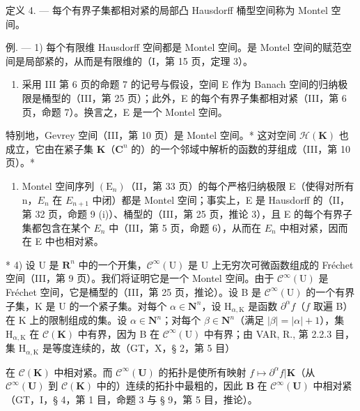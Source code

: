 定义 4. --- 每个有界子集都相对紧的局部凸 Hausdorff 桶型空间称为 Montel 空间。

例. --- 1) 每个有限维 Hausdorff 空间都是 Montel 空间。是 Montel 空间的赋范空间是局部紧的，从而是有限维的（I，第 15 页，定理 3）。

\begin{enumerate}
\def\labelenumi{\arabic{enumi})}
\setcounter{enumi}{1}
\tightlist
\item
  采用 III 第 6 页的命题 7 的记号与假设，空间 E 作为 Banach 空间的归纳极限是桶型的（III，第 25 页）；此外，E 的每个有界子集都相对紧（III，第 6 页，命题 7）。换言之，E 是一个 Montel 空间。
\end{enumerate}

特别地，Gevrey 空间（III，第 10 页）是 Montel 空间。* 这对空间 \(\mathcal{H}(\mathbf{K})\) 也成立，它由在紧子集 \(\mathbf{K}\)（\(\mathbf{C}^n\) 的）的一个邻域中解析的函数的芽组成（III，第 10 页）。*

\begin{enumerate}
\def\labelenumi{\arabic{enumi})}
\setcounter{enumi}{2}
\tightlist
\item
  Montel 空间序列 \((\mathrm{E}_{n})\)（II，第 33 页）的每个严格归纳极限 E（使得对所有 n，\(E_{n}\) 在 \(E_{n+1}\) 中闭）都是 Montel 空间；事实上，E 是 Hausdorff 的（II，第 32 页，命题 9 (i)）、桶型的（III，第 25 页，推论 3），且 E 的每个有界子集都包含在某个 \(E_{n}\) 中（III，第 5 页，命题 6），从而在 \(E_{n}\) 中相对紧，因而在 E 中也相对紧。
\end{enumerate}

* 4) 设 U 是 \(\mathbf{R}^n\) 中的一个开集，\(\mathcal{C}^\infty (\mathrm{U})\) 是 U 上无穷次可微函数组成的 Fréchet 空间（III，第 9 页）。我们将证明它是一个 Montel 空间。由于 \(\mathcal{C}^\infty (\mathrm{U})\) 是 Fréchet 空间，它是桶型的（III，第 25 页，推论）。设 B 是 \(\mathcal{C}^\infty (\mathrm{U})\) 的一个有界子集，K 是 U 的一个紧子集。对每个 \(\alpha \in \mathbf{N}^n\)，设 \(\mathrm{H}_{\alpha ,\mathrm{K}}\) 是函数 \(\partial^{\alpha}f\)（\(f\) 取遍 B）在 K 上的限制组成的集。设 \(\alpha \in \mathbf{N}^n\)；对每个 \(\beta \in \mathbf{N}^n\)（满足 \(|\beta | = |\alpha | + 1\)），集 \(\mathrm{H}_{\alpha ,\mathrm{K}}\) 在 \(\mathcal{C}(\mathbf{K})\) 中有界，因为 B 在 \(\mathcal{C}^\infty (\mathrm{U})\) 中有界；由 VAR, R., 第 2.2.3 目，集 \(\mathrm{H}_{\alpha ,\mathrm{K}}\) 是等度连续的，故（GT，X，§ 2，第 5 目）

在 \(\mathcal{C}(\mathbf{K})\) 中相对紧。而 \(\mathcal{C}^{\infty}(\mathbf{U})\) 的拓扑是使所有映射 \(f\mapsto \partial^{\alpha}f|\mathbf{K}\)（从 \(\mathcal{C}^{\infty}(\mathbf{U})\) 到 \(\mathcal{C}(\mathbf{K})\) 中的）连续的拓扑中最粗的，因此 \(\mathbf{B}\) 在 \(\mathcal{C}^{\infty}(\mathbf{U})\) 中相对紧（GT，I，§ 4，第 1 目，命题 3 与 § 9，第 5 目，推论）。


